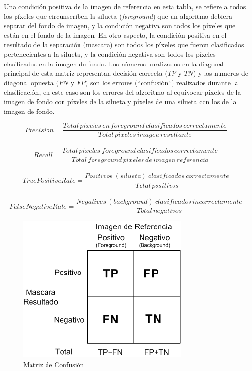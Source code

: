 Una condición positiva de la imagen de referencia en esta tabla, se refiere a todos los píxeles que circunscriben la silueta (\emph{foreground}) que un algoritmo debiera separar del fondo de imagen, y la condición negativa son todos los píxeles que están en el fondo de la imagen. En otro aspecto, la condición positiva en el resultado de la separación (mascara) son todos los píxeles que fueron clasificados pertenecientes a la silueta, y la condición negativa son todos los píxeles clasificados en la imagen de fondo. Los números localizados en la diagonal principal de esta matriz representan decisión correcta ($TP$ y $TN$) y los números de diagonal opuesta ($FN$ y $FP$) son los errores (``confusión'') realizados durante la clasificación, en este caso son los errores del algoritmo al equivocar píxeles de la imagen de fondo con píxeles de la silueta y píxeles de una silueta con los de la imagen de fondo.




\[
Precision=\frac{Total \: pixeles \, en \, foreground \, clasificados \, correctamente}{Total \, pixeles \, imagen \, resultante}
\]\\
\[
Recall=\frac{Total \: pixeles \: foreground \, clasificados \, correctamente}{Total \, foreground \, pixeles \, de \, imagen \, referencia}
\]\\
\[
True Positive Rate=\frac{Positivos  \: (silueta) \: clasificados \, correctamente}{Total \, positivos}
\]\\
\[
False Negative Rate=\frac{Negatives  \: (background) \: clasificados \, incorrectamente}{Total \, negativos}
\]


\begin{figure}[!ht]
\centering
\includegraphics[scale=0.6]{img/ch4/Confusion_Matrix}
\caption{Matriz de Confusión}
\label{fig:confusion_matrix}
\end{figure}



